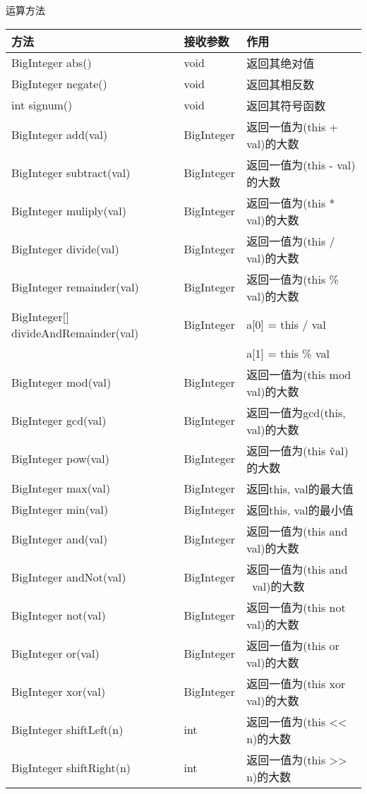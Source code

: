 运算方法
\begin{longtable}{|p{6.2cm}|p{2.7cm}|p{6.2cm}|}
\hline
 方法 & 接收参数 & 作用 \\
\hline
 BigInteger abs() & void & 返回其绝对值 \\
\hline
 BigInteger negate() & void & 返回其相反数 \\
\hline
 int signum() & void & 返回其符号函数 \\
\hline
 BigInteger add(val) & BigInteger & 返回一值为(this + val)的大数 \\
\hline
 BigInteger subtract(val) & BigInteger & 返回一值为(this - val)的大数 \\
\hline
 BigInteger muliply(val) & BigInteger & 返回一值为(this * val)的大数 \\
\hline
 BigInteger divide(val) & BigInteger & 返回一值为(this / val)的大数 \\
\hline
 BigInteger remainder(val) & BigInteger & 返回一值为(this \% val)的大数 \\
\hline
 BigInteger[] divideAndRemainder(val) & BigInteger & a[0] = this / val \\
 & & a[1] = this \% val \\
\hline
 BigInteger mod(val) & BigInteger & 返回一值为(this mod val)的大数 \\
\hline
 BigInteger gcd(val) & BigInteger & 返回一值为gcd(this, val)的大数 \\
\hline
 BigInteger pow(val) & BigInteger & 返回一值为(this \^ val)的大数 \\
\hline
 BigInteger max(val) & BigInteger & 返回this, val的最大值 \\
\hline
 BigInteger min(val) & BigInteger & 返回this, val的最小值 \\
\hline
 BigInteger and(val) & BigInteger & 返回一值为(this and val)的大数 \\
\hline
 BigInteger andNot(val) & BigInteger & 返回一值为(this and ~val)的大数 \\
\hline
 BigInteger not(val) & BigInteger & 返回一值为(this not val)的大数 \\
\hline
 BigInteger or(val) & BigInteger & 返回一值为(this or val)的大数 \\
\hline
 BigInteger xor(val) & BigInteger & 返回一值为(this xor val)的大数 \\
\hline
 BigInteger shiftLeft(n) & int & 返回一值为(this << n)的大数 \\
\hline
 BigInteger shiftRight(n) & int & 返回一值为(this >> n)的大数 \\
\hline
\end{longtable}


